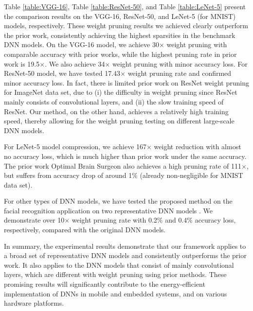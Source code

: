 \documentclass{article} %
\begin{document}
Table \ref{table:VGG-16}, Table \ref{table:ResNet-50}, and Table \ref{table:LeNet-5} present the comparison results on the VGG-16, ResNet-50, and LeNet-5 (for MNIST) models, respectively. These weight pruning results we achieved clearly outperform the prior work, consistently achieving the highest sparsities in the benchmark DNN models. On the VGG-16 model, we achieve 30$\times$ weight pruning with comparable accuracy with prior works, while the highest pruning rate in prior work is 19.5$\times$. We also achieve 34$\times$ weight pruning with minor accuracy loss. For ResNet-50 model, we have tested 17.43$\times$ weight pruning rate and confirmed minor accuracy loss. In fact, there is limited prior work on ResNet weight pruning for ImageNet data set, due to (i) the difficulty in weight pruning since ResNet mainly consists of convolutional layers, and (ii) the slow training speed of ResNet. Our method, on the other hand, achieves a relatively high training speed, thereby allowing for the weight pruning testing on different large-scale DNN models.

For LeNet-5 model compression, we achieve 167$\times$ weight reduction with almost no accuracy loss, which is much higher than prior work under the same accuracy. The prior work Optimal Brain Surgeon \citep{dong2017learning} also achieves a high pruning rate of 111$\times$, but suffers from accuracy drop of around 1\% (already non-negligible for MNIST data set).

For other types of DNN models, we have tested the proposed method on the facial recognition application on two representative DNN models \citep{cvpr2016_gazecapture,JostineHo2016}. We demonstrate over 10$\times$ weight pruning rate with 0.2\% and 0.4\% accuracy loss, respectively, compared with the original DNN models.

In summary, the experimental results demonstrate that our framework applies to a broad set of representative DNN models and consistently outperforms the prior work. It also applies to the DNN models that consist of mainly convolutional layers, which are different with weight pruning using prior methods. These promising results will significantly contribute to the energy-efficient implementation of DNNs in mobile and embedded systems, and on various hardware platforms.
\end{document}
